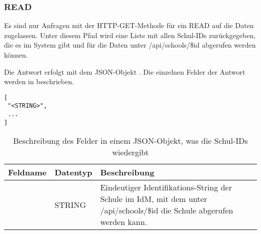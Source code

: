 \subsubsection{READ}
\label{sec:rest:api:school:read}
Es sind nur Anfragen mit der HTTP-GET-Methode für ein READ auf die Daten zugelassen.
Unter diesem Pfad wird eine Liste mit allen Schul-IDs zurückgegeben, die es im System gibt und für die Daten unter /api/schools/\$id abgerufen werden können.

Die Antwort erfolgt mit dem JSON-Objekt . 
Die einzelnen Felder der Antwort werden in  beschrieben.

\begin{lstlisting}[caption={JSON-Antwort für einen GET-Aufruf des Pfads /api/schools},label={lst:code:rest:api:school:read:ret},frame=tlrb]
[
 "<STRING>",
 ...
]
\end{lstlisting}

\begin{longtable}{|p{}|p{}|p{}|}
		\caption{Beschreibung des Felder in einem JSON-Objekt, was die Schul-IDs wiedergibt}
\endfoot
		\caption{Beschreibung des Felder in einem JSON-Objekt, was die Schul-IDs wiedergibt}
		\label{tab:rest:api:school:read:ret}
\endlastfoot 
\hline
			\textbf{Feldname} & \textbf{Datentyp} & \textbf{Beschreibung} \\ \hline
\endhead
 & STRING & Eindeutiger Identifikations-String der Schule im IdM, mit dem unter /api/schools/\$id die Schule abgerufen werden kann.\\ \hline
\end{longtable}
